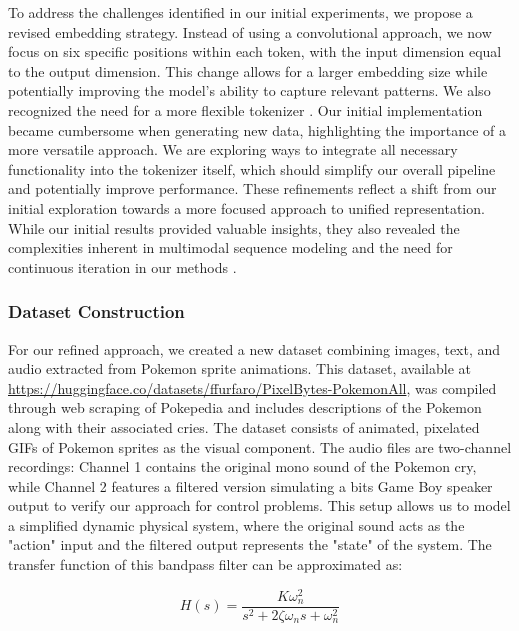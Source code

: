 \documentclass[10pt,a4paper]{article}
\begin{document}
To address the challenges identified in our initial experiments, we propose a revised embedding strategy. Instead of using a convolutional approach, we now focus on six specific positions within each token, with the input dimension equal to the output dimension. This change allows for a larger embedding size while potentially improving the model's ability to capture relevant patterns. We also recognized the need for a more flexible tokenizer \cite{kudo2018sentencepiece}. Our initial implementation became cumbersome when generating new data, highlighting the importance of a more versatile approach. We are exploring ways to integrate all necessary functionality into the tokenizer itself, which should simplify our overall pipeline and potentially improve performance. These refinements reflect a shift from our initial exploration towards a more focused approach to unified representation. While our initial results provided valuable insights, they also revealed the complexities inherent in multimodal sequence modeling and the need for continuous iteration in our methods \cite{lecun2015deep}.

\subsubsection{Dataset Construction}

\sloppy

For our refined approach, we created a new dataset combining images, text, and audio extracted from Pokemon sprite animations. This dataset, available at \url{https://huggingface.co/datasets/ffurfaro/PixelBytes-PokemonAll}, was compiled through web scraping of Pokepedia and includes descriptions of the Pokemon along with their associated cries. The dataset consists of animated, pixelated GIFs of Pokemon sprites as the visual component. The audio files are two-channel recordings: Channel 1 contains the original mono sound of the Pokemon cry, while Channel 2 features a filtered version simulating a bits Game Boy speaker output to verify our approach for control problems. This setup allows us to model a simplified dynamic physical system, where the original sound acts as the "action" input and the filtered output represents the "state" of the system. The transfer function of this bandpass filter can be approximated as:

\begin{equation}
H(s) = \frac{K \omega_n^2}{s^2 + 2\zeta\omega_n s + \omega_n^2}
\end{equation}
\end{document}
